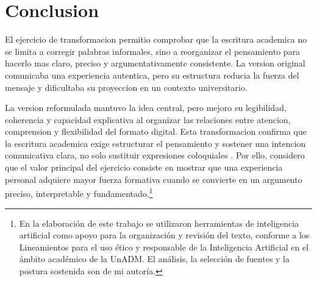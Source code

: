 \documentclass[
	spanish,
	letterpaper, oneside
]{article}
\begin{document}
\section{Conclusion}

El ejercicio de transformacion permitio comprobar que la escritura academica no se limita a corregir palabras informales, sino a reorganizar el pensamiento para hacerlo mas claro, preciso y argumentativamente consistente. La version original comunicaba una experiencia autentica, pero su estructura reducia la fuerza del mensaje y dificultaba su proyeccion en un contexto universitario.

La version reformulada mantuvo la idea central, pero mejoro su legibilidad, coherencia y capacidad explicativa al organizar las relaciones entre atencion, comprension y flexibilidad del formato digital. Esta transformacion confirma que la escritura academica exige estructurar el pensamiento y sostener una intencion comunicativa clara, no solo sustituir expresiones coloquiales \citep{nunezcortesEscrituraAcademicaTeoria2015,vitoriaEscrituraAcademicaFormacion2019}. Por ello, considero que el valor principal del ejercicio consiste en mostrar que una experiencia personal adquiere mayor fuerza formativa cuando se convierte en un argumento preciso, interpretable y fundamentado.\footnote{En la elaboración de este trabajo se utilizaron herramientas de inteligencia artificial como apoyo para la organización y revisión del texto, conforme a los Lineamientos para el uso ético y responsable de la Inteligencia Artificial en el ámbito académico de la UnADM. El análisis, la selección de fuentes y la postura sostenida son de mi autoría.}

% 




\end{document}
